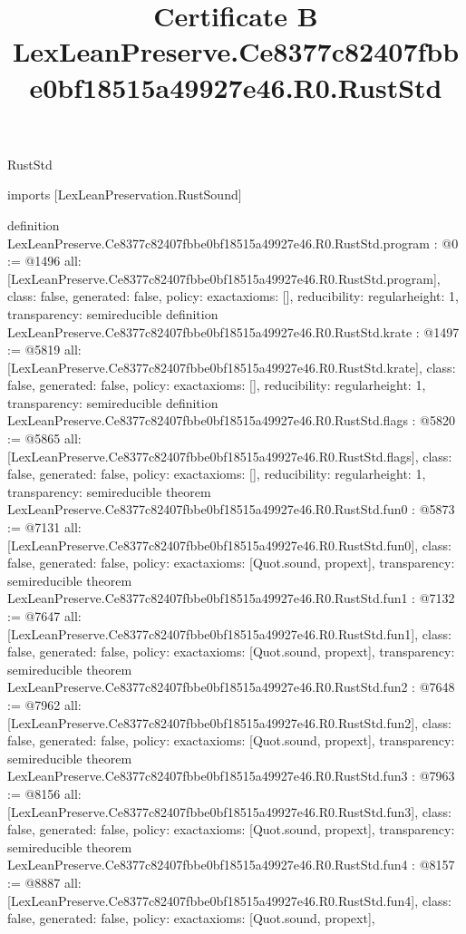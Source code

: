 \begin{lexlean}{RustStd}
\title{Certificate B LexLeanPreserve.Ce8377c82407fbbe0bf18515a49927e46.R0.RustStd}
\begin{coremodule}
imports [LexLeanPreservation.RustSound]

definition LexLeanPreserve.Ce8377c82407fbbe0bf18515a49927e46.R0.RustStd.program : @0 := @1496 {
  all: [LexLeanPreserve.Ce8377c82407fbbe0bf18515a49927e46.R0.RustStd.program],
  class: false,
  generated: false,
  policy: exact{axioms: []},
  reducibility: regular{height: 1},
  transparency: semireducible
}
definition LexLeanPreserve.Ce8377c82407fbbe0bf18515a49927e46.R0.RustStd.krate : @1497 := @5819 {
  all: [LexLeanPreserve.Ce8377c82407fbbe0bf18515a49927e46.R0.RustStd.krate],
  class: false,
  generated: false,
  policy: exact{axioms: []},
  reducibility: regular{height: 1},
  transparency: semireducible
}
definition LexLeanPreserve.Ce8377c82407fbbe0bf18515a49927e46.R0.RustStd.flags : @5820 := @5865 {
  all: [LexLeanPreserve.Ce8377c82407fbbe0bf18515a49927e46.R0.RustStd.flags],
  class: false,
  generated: false,
  policy: exact{axioms: []},
  reducibility: regular{height: 1},
  transparency: semireducible
}
theorem LexLeanPreserve.Ce8377c82407fbbe0bf18515a49927e46.R0.RustStd.fun0 : @5873 := @7131 {
  all: [LexLeanPreserve.Ce8377c82407fbbe0bf18515a49927e46.R0.RustStd.fun0],
  class: false,
  generated: false,
  policy: exact{axioms: [Quot.sound, propext]},
  transparency: semireducible
}
theorem LexLeanPreserve.Ce8377c82407fbbe0bf18515a49927e46.R0.RustStd.fun1 : @7132 := @7647 {
  all: [LexLeanPreserve.Ce8377c82407fbbe0bf18515a49927e46.R0.RustStd.fun1],
  class: false,
  generated: false,
  policy: exact{axioms: [Quot.sound, propext]},
  transparency: semireducible
}
theorem LexLeanPreserve.Ce8377c82407fbbe0bf18515a49927e46.R0.RustStd.fun2 : @7648 := @7962 {
  all: [LexLeanPreserve.Ce8377c82407fbbe0bf18515a49927e46.R0.RustStd.fun2],
  class: false,
  generated: false,
  policy: exact{axioms: [Quot.sound, propext]},
  transparency: semireducible
}
theorem LexLeanPreserve.Ce8377c82407fbbe0bf18515a49927e46.R0.RustStd.fun3 : @7963 := @8156 {
  all: [LexLeanPreserve.Ce8377c82407fbbe0bf18515a49927e46.R0.RustStd.fun3],
  class: false,
  generated: false,
  policy: exact{axioms: [Quot.sound, propext]},
  transparency: semireducible
}
theorem LexLeanPreserve.Ce8377c82407fbbe0bf18515a49927e46.R0.RustStd.fun4 : @8157 := @8887 {
  all: [LexLeanPreserve.Ce8377c82407fbbe0bf18515a49927e46.R0.RustStd.fun4],
  class: false,
  generated: false,
  policy: exact{axioms: [Quot.sound, propext]},
}
\end{coremodule}
\end{lexlean}

